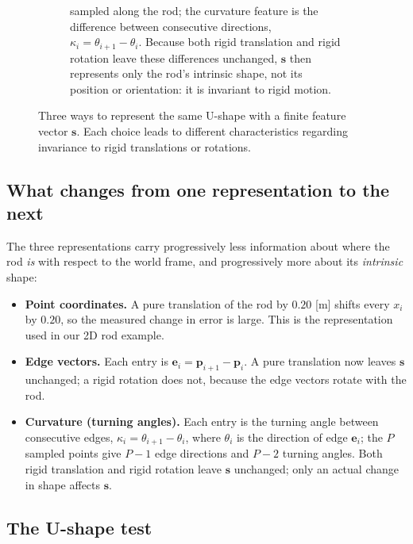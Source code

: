 \documentclass[11pt,a4paper]{article}
\begin{document}
\begin{figure}[h!]
\begin{subfigure}[t]{0.32\linewidth}
{sampled along the rod; the curvature feature is the difference between consecutive directions,
$\kappa_i = \theta_{i+1}-\theta_i$. Because both rigid translation and rigid rotation
leave these differences unchanged, $\mathbf{s}$ then represents only the rod's intrinsic shape,
not its position or orientation: it is invariant to rigid motion.}
\label{fig:rep-curv}
\end{subfigure}
\caption{Three ways to represent the same U-shape with a finite feature vector $\mathbf{s}$. Each choice
leads to different characteristics regarding invariance to rigid translations or rotations.}
\label{fig:representations}
\end{figure}

\subsection*{What changes from one representation to the next}

The three representations carry progressively less information about where the rod \textit{is}
with respect to the world frame, and progressively more about its \textit{intrinsic} shape:

\begin{itemize}
    \item \textbf{Point coordinates.} A pure translation of the rod by $0.20$ [m] shifts every
    $x_i$ by $0.20$, so the measured change in error is large. This is the representation used
    in our 2D rod example.
    \item \textbf{Edge vectors.} Each entry is $\mathbf{e}_i = \mathbf{p}_{i+1}-\mathbf{p}_i$. A pure
    translation now leaves $\mathbf{s}$ unchanged; a rigid rotation does not, because the edge
    vectors rotate with the rod.
    \item \textbf{Curvature (turning angles).} Each entry is the turning angle between
    consecutive edges, $\kappa_i = \theta_{i+1}-\theta_i$, where $\theta_i$ is the direction of
    edge $\mathbf{e}_i$; the $P$ sampled points give $P-1$ edge directions and $P-2$ turning angles.
    Both rigid translation and rigid rotation leave $\mathbf{s}$ unchanged; only an actual change in
    shape affects $\mathbf{s}$.
\end{itemize}

\subsection*{The U-shape test}
\end{document}
